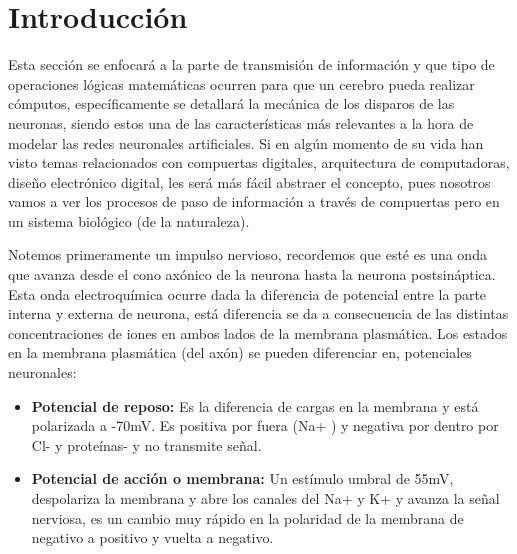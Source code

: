 \section{Introducción}
Esta sección se enfocará a la parte de transmisión de información y que tipo de operaciones lógicas matemáticas ocurren para que un cerebro pueda realizar cómputos, específicamente se detallará la mecánica de los disparos de las neuronas, siendo estos una de las características más relevantes a la hora de modelar las redes neuronales artificiales. Si en algún momento de su vida han visto temas relacionados con compuertas digitales, arquitectura de computadoras, diseño electrónico digital, les será más fácil abstraer el concepto, pues nosotros vamos a ver los procesos de paso de información a través de compuertas pero en un sistema biológico (de la naturaleza). 

Notemos primeramente un impulso nervioso, recordemos que esté es una onda que avanza desde el cono axónico de la neurona hasta la neurona postsináptica. Esta onda electroquímica ocurre dada la diferencia de potencial entre la parte interna y externa de neurona, está diferencia se da a consecuencia de las distintas concentraciones de iones en ambos lados de la membrana plasmática. Los estados en la membrana plasmática (del axón) se pueden diferenciar en, potenciales neuronales:

\begin{itemize}
\item \textbf{Potencial de reposo:} Es la diferencia de cargas en la membrana y está polarizada a -70mV. Es positiva por fuera (Na+ ) y negativa por dentro por Cl- y proteínas- y no transmite señal. 
\item \textbf{Potencial de acción o membrana:} Un estímulo umbral de 55mV, despolariza la membrana y abre los canales del Na+ y K+ y avanza la señal nerviosa, es un cambio muy rápido en la polaridad de la membrana de negativo a positivo y vuelta a negativo.
\end{itemize}

